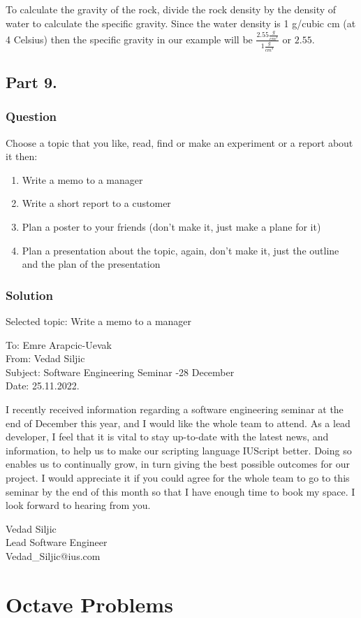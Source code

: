 \documentclass[a4paper, 10pt]{article}
\newcommand{\volumeUnit}[0]{\frac{g}{cm^{3}}}
\begin{document}
				\noindent To calculate the gravity of the rock, divide the rock density by the density of water to calculate the specific gravity. Since the water density is 1 g/cubic cm (at 4 Celsius) then the specific gravity in our example will be $\frac{2.55\volumeUnit}{1\volumeUnit}$ or $2.55$.
				
		\subsection{Part 9.}
			\subsubsection{Question}
				\noindent Choose a topic that you like, read, find or make an experiment or a report about it then:
				\begin{enumerate}
					\item Write a memo to a manager
					\item Write a short report to a customer
					\item Plan a poster to your friends (don’t make it, just make a plane for it)
					\item Plan a presentation about the topic, again, don’t make it, just the outline and the plan of the presentation
				\end{enumerate}
			\subsubsection{Solution}
				\noindent Selected topic: Write a memo to a manager
				\begin{tcolorbox}[colback=red!5!white,colframe=red!75!black,title=Memo To My Manager]
					To: Emre Arapcic-Uevak\\
					From: Vedad Siljic\\
					Subject: Software Engineering Seminar -28 December\\
					Date: 25.11.2022.\\
					\hspace{3mm}
					
					I recently received information regarding a software engineering seminar at the end of December this year, and I would like the whole team to attend.
					As a lead developer, I feel that it is vital to stay up-to-date with the latest news, and information, to help us to make our scripting language IUScript better. Doing so enables us to continually grow, in turn giving the best possible outcomes for our project.
					I would appreciate it if you could agree for the whole team to go to this seminar by the end of this month so that I have enough time to book my space.
					I look forward to hearing from you.
					
					\tcblower
					Vedad Siljic\\
					Lead Software Engineer\\
					Vedad\_Siljic@ius.com				
				\end{tcolorbox}
		\pagebreak
		\section{Octave Problems}
		
		
\end{document}
